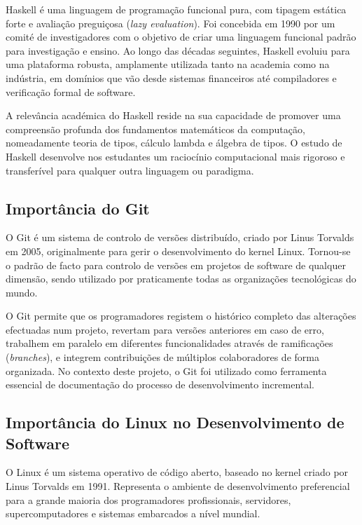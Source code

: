 \documentclass[12pt, a4paper, oneside]{report}
\begin{document}
Haskell é uma linguagem de programação funcional pura, com tipagem estática forte e avaliação preguiçosa (\textit{lazy evaluation}). Foi concebida em 1990 por um comité de investigadores com o objetivo de criar uma linguagem funcional padrão para investigação e ensino. Ao longo das décadas seguintes, Haskell evoluiu para uma plataforma robusta, amplamente utilizada tanto na academia como na indústria, em domínios que vão desde sistemas financeiros até compiladores e verificação formal de software.

A relevância académica do Haskell reside na sua capacidade de promover uma compreensão profunda dos fundamentos matemáticos da computação, nomeadamente teoria de tipos, cálculo lambda e álgebra de tipos. O estudo de Haskell desenvolve nos estudantes um raciocínio computacional mais rigoroso e transferível para qualquer outra linguagem ou paradigma.

\subsection{Importância do Git}

O Git é um sistema de controlo de versões distribuído, criado por Linus Torvalds em 2005, originalmente para gerir o desenvolvimento do kernel Linux. Tornou-se o padrão de facto para controlo de versões em projetos de software de qualquer dimensão, sendo utilizado por praticamente todas as organizações tecnológicas do mundo.

O Git permite que os programadores registem o histórico completo das alterações efectuadas num projeto, revertam para versões anteriores em caso de erro, trabalhem em paralelo em diferentes funcionalidades através de ramificações (\textit{branches}), e integrem contribuições de múltiplos colaboradores de forma organizada. No contexto deste projeto, o Git foi utilizado como ferramenta essencial de documentação do processo de desenvolvimento incremental.

\subsection{Importância do Linux no Desenvolvimento de Software}

O Linux é um sistema operativo de código aberto, baseado no kernel criado por Linus Torvalds em 1991. Representa o ambiente de desenvolvimento preferencial para a grande maioria dos programadores profissionais, servidores, supercomputadores e sistemas embarcados a nível mundial.
\end{document}
